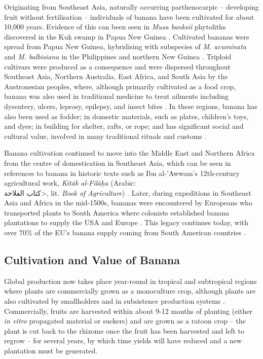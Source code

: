 Originating from Southeast Asia, naturally occurring parthenocarpic – developing fruit without fertilisation – individuals of banana have been cultivated for about 10,000 years. Evidence of this can been seen in \textit{Musa banksii} phytoliths discovered in the Kuk swamp in Papua New Guinea \parencite{Denham2011}. Cultivated bananas were spread from Papua New Guinea, hybridising with subspecies of \textit{M. acuminata} and \textit{M. balbisiana} in the Philippines and northern New Guinea \parencite{Perrier2009}. Triploid cultivars were produced as a consequence and were dispersed throughout Southeast Asia, Northern Australia, East Africa, and South Asia by the Austronesian peoples, where, although primarily cultivated as a food crop, banana was also used in traditional medicine to treat ailments including dysentery, ulcers, leprosy, epilepsy, and insect bites \parencite{Kumar2012}. In these regions, banana has also been used as fodder; in domestic materials, such as plates, children’s toys, and dyes; in building for shelter, rafts, or rope; and has significant social and cultural value, involved in many traditional rituals and customs \parencite{Hapsari2017} .  

Banana cultivation continued to move into the Middle East and Northern Africa from the centre of domestication in Southeast Asia, which can be seen in references to banana in historic texts such as Ibn al-'Awwam's 12th-century agricultural work, \textit{Kit\=ab al-Fil\=a\d{h}a} (Arabic:\\ \<كتاب الفلاحة>, lit. \textit{Book of Agriculture}) \parencite{Clement1866}. Later, during expeditions in Southeast Asia and Africa in the mid-1500s, bananas were encountered by Europeans who transported plants to South America where colonists established banana plantations to supply the USA and Europe \parencite{Guzman-Rivas1960, Salas-Pascual2022}. This legacy continues today, with over 70\% of the EU’s banana supply coming from South American countries \parencite{EuropeanUnion2022}.  

\subsection{Cultivation and Value of Banana}
\label{sec:cultivation}

Global production now takes place year-round in tropical and subtropical regions where plants are commercially grown as a monoculture crop, although plants are also cultivated by smallholders and in subsistence production systems \parencite{Viljoen2020}. Commercially, fruits are harvested within about 9-12 months of planting (either\textit{ in vitro} propagated material or suckers) and are grown as a ratoon crop – the plant is cut back to the rhizome once the fruit has been harvested and left to regrow – for several years, by which time yields will have reduced and a new plantation must be generated. 

